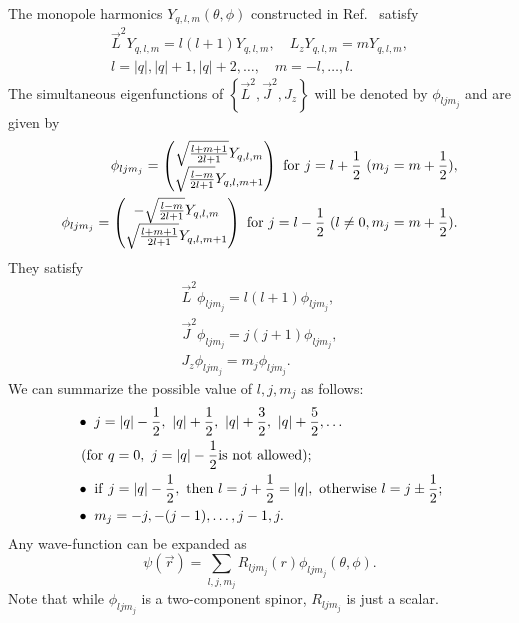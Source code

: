 \documentclass[a4paper,12pt, amsfonts, amssymb]{article}
\begin{document}
The monopole harmonics $Y_{q,l,m}(\theta, \phi)$ constructed in 
Ref.~\cite{WY} satisfy
\begin{align*}
{\vec{L}}^2Y_{q,l,m}=l(l+1)Y_{q,l,m},\quad L_zY_{q,l,m}=mY_{q,l,m},\\
l=|q|,|q|+1,|q|+2,\ldots,\quad m=-l,\ldots,l.
\end{align*}
The simultaneous eigenfunctions of $\left\{ 
{\vec{L}}^2, {\vec{J}}^2, J_z\right\}$ will be denoted by $\phi_{ljm_j}$
and are given by
\begin{eqnarray}
\phi_{ljm_j}=\begin{pmatrix}
\sqrt{\frac{l+m+1}{2l+1}} Y_{q,l,m} \\
\sqrt{\frac{l-m}{2l+1}} Y_{q,l,m+1}
             \end{pmatrix}
\ {\rm for}\ j=l+\frac{1}{2}\ (m_j=m+\frac{1}{2}),\nonumber\\
\phi_{ljm_j}=\begin{pmatrix}
-\sqrt{\frac{l-m}{2l+1}} Y_{q,l,m}\\
\sqrt{\frac{l+m+1}{2l+1}} Y_{q,l,m+1}
             \end{pmatrix}
\ {\rm for}\ j=l-\frac{1}{2}\ (l\neq 0, m_j=m+\frac{1}{2}).\nonumber
\end{eqnarray}
They satisfy
\begin{eqnarray}
{\vec{L}}^2\phi_{ljm_j}=l(l+1)\phi_{ljm_j},\nonumber\\
{\vec{J}^2}\phi_{ljm_j}=j(j+1)\phi_{ljm_j},\nonumber\\
J_z\phi_{ljm_j}=m_j\phi_{ljm_j}.\nonumber
\end{eqnarray}
We can summarize the possible value of $l, j, m_j$ as follows:
\begin{align*}
&\bullet\ j=|q|-\frac{1}{2},\ |q|+\frac{1}{2},\ |q|+\frac{3}{2},\  
|q|+\frac{5}{2},\ldots\\
&\ ({\rm for}\ q=0,\ j=|q|-\frac{1}{2} {\rm is\ not\ allowed});\\
&\bullet\ {\rm if}\ j=|q|-\frac{1}{2},\ {\rm then}\ l=j+\frac{1}{2}=|q|,
\ {\rm otherwise}\ l=j\pm \frac{1}{2};\\
&\bullet\ m_j= -j, -(j-1),\ldots, j-1, j.
\end{align*}
Any wave-function can be expanded as
\begin{equation*}
\psi(\vec{r})=\sum_{l,j,m_j}R_{ljm_j}(r)\phi_{ljm_j}(\theta,\phi).
\end{equation*}
Note that while $\phi_{ljm_j}$ is a two-component spinor, $R_{ljm_j}$ is 
just a scalar.
\end{document}
